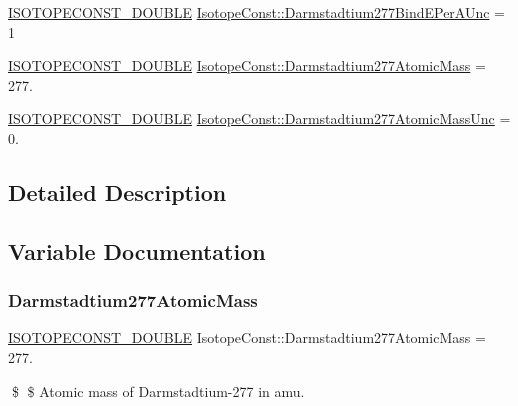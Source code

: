 \begin{DoxyCompactItemize}
\item 
\mbox{\hyperlink{group___isotope_const-_macros_ga8f45a7272ce02c0b4c65c44636ed719a}{I\+S\+O\+T\+O\+P\+E\+C\+O\+N\+S\+T\+\_\+\+D\+O\+U\+B\+LE}} \mbox{\hyperlink{group___isotope_const-_darmstadtium-_ds277_ga3b938ddd9a9709a12ce06727488c37d3}{Isotope\+Const\+::\+Darmstadtium277\+Bind\+E\+Per\+A\+Unc}} = 1
\item 
\mbox{\hyperlink{group___isotope_const-_macros_ga8f45a7272ce02c0b4c65c44636ed719a}{I\+S\+O\+T\+O\+P\+E\+C\+O\+N\+S\+T\+\_\+\+D\+O\+U\+B\+LE}} \mbox{\hyperlink{group___isotope_const-_darmstadtium-_ds277_ga743bcaaa7602e76f14d9e86c015df518}{Isotope\+Const\+::\+Darmstadtium277\+Atomic\+Mass}} = 277.
\item 
\mbox{\hyperlink{group___isotope_const-_macros_ga8f45a7272ce02c0b4c65c44636ed719a}{I\+S\+O\+T\+O\+P\+E\+C\+O\+N\+S\+T\+\_\+\+D\+O\+U\+B\+LE}} \mbox{\hyperlink{group___isotope_const-_darmstadtium-_ds277_gaf3b79efe5f63c1f933468e47f571e64a}{Isotope\+Const\+::\+Darmstadtium277\+Atomic\+Mass\+Unc}} = 0.
\end{DoxyCompactItemize}


\subsection{Detailed Description}


\subsection{Variable Documentation}
\mbox{\label{group___isotope_const-_darmstadtium-_ds277_ga743bcaaa7602e76f14d9e86c015df518}} 
\subsubsection{\texorpdfstring{Darmstadtium277\+Atomic\+Mass}{Darmstadtium277AtomicMass}}
{\footnotesize\ttfamily \mbox{\hyperlink{group___isotope_const-_macros_ga8f45a7272ce02c0b4c65c44636ed719a}{I\+S\+O\+T\+O\+P\+E\+C\+O\+N\+S\+T\+\_\+\+D\+O\+U\+B\+LE}} Isotope\+Const\+::\+Darmstadtium277\+Atomic\+Mass = 277.}

\$ \$ Atomic mass of Darmstadtium-\/277 in amu. \mbox{\label{group___isotope_const-_darmstadtium-_ds277_gaf3b79efe5f63c1f933468e47f571e64a}} 
